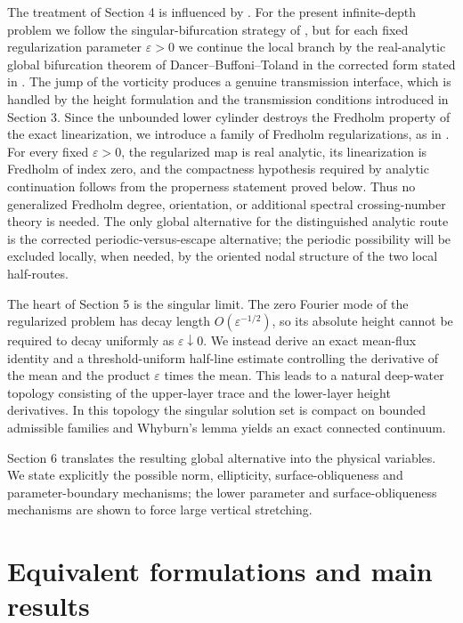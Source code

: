 \documentclass[11pt,reqno]{amsart}
\numberwithin{equation}{section}
\theoremstyle{definition}
\theoremstyle{remark}
\begin{document}
The treatment of Section 4 is influenced by
\cite{ConstantinS,ConstantinSV,Hur11,MartinM}.  For the present
infinite-depth problem we follow the singular-bifurcation strategy of
\cite{Hur11}, but for each fixed regularization parameter
$\varepsilon>0$ we continue the local branch by the real-analytic
global bifurcation theorem of Dancer--Buffoni--Toland in the corrected
form stated in \cite[Theorem 6 and Remarks 7--8]{ConstantinSV}.
The jump of the vorticity produces a genuine transmission interface,
which is handled by the height formulation and the transmission
conditions introduced in Section 3.  Since the unbounded lower
cylinder destroys the Fredholm property of the exact linearization,
we introduce a family of Fredholm regularizations, as in
\cite{Hur11}.  For every fixed $\varepsilon>0$, the regularized map is
real analytic, its linearization is Fredholm of index zero, and the
compactness hypothesis required by analytic continuation follows from
the properness statement proved below.  Thus no generalized Fredholm
degree, orientation, or additional spectral crossing-number theory is
needed.  The only global alternative for the distinguished analytic
route is the corrected periodic-versus-escape alternative; the
periodic possibility will be excluded locally, when needed, by the
oriented nodal structure of the two local half-routes.

The heart of Section 5 is the singular limit.  The zero Fourier mode
of the regularized problem has decay length $O(\varepsilon^{-1/2})$,
so its absolute height cannot be required to decay uniformly as
$\varepsilon\downarrow0$.  We instead derive an exact mean-flux identity
and a threshold-uniform half-line estimate controlling the derivative
of the mean and the product $\varepsilon$ times the mean.  This leads
to a natural deep-water topology consisting of the upper-layer trace
and the lower-layer height derivatives.  In this topology the singular
solution set is compact on bounded admissible families and Whyburn's
lemma yields an exact connected continuum.

Section 6 translates the resulting global alternative into the physical
variables.  We state explicitly the possible norm, ellipticity,
surface-obliqueness and parameter-boundary mechanisms; the lower
parameter and surface-obliqueness mechanisms are shown to force large
vertical stretching.


\section{Equivalent formulations and main results}
\end{document}
